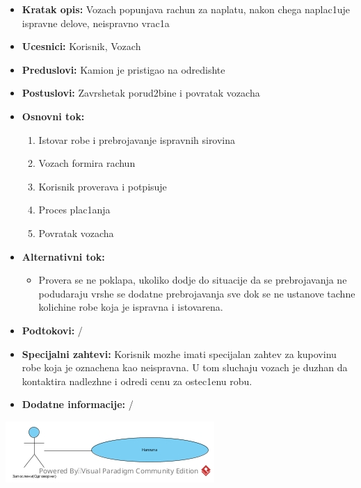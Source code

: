\begin{itemize}
	\item {\textbf{Kratak opis:}  Vozach popunjava rachun za naplatu, nakon chega naplac1uje ispravne delove, neispravno vrac1a}
	\item{\textbf{Ucesnici:} Korisnik, Vozach }
	\item{\textbf{Preduslovi:} Kamion je pristigao na odredishte }
	\item{\textbf{Postuslovi:} Zavrshetak porud2bine i povratak vozacha}
	\item{\textbf{Osnovni tok:}  \begin{enumerate}
				\item {Istovar robe i prebrojavanje ispravnih sirovina}
				\item {Vozach formira rachun}
				\item {Korisnik proverava i potpisuje}
				\item {Proces plac1anja}
				\item {Povratak vozacha}
	\end{enumerate}}
\item{\textbf{Alternativni tok:} \begin{itemize}
		\item{Provera se ne poklapa, ukoliko dodje do situacije da se prebrojavanja ne podudaraju vrshe se dodatne prebrojavanja sve dok se ne ustanove tachne kolichine robe koja je ispravna i istovarena.}
	\end{itemize}}
\item{\textbf{Podtokovi:} /}
\item{\textbf{Specijalni zahtevi:} Korisnik mozhe imati specijalan zahtev za kupovinu robe koja je oznachena kao neispravna. U tom sluchaju vozach je duzhan da kontaktira nadlezhne i odredi cenu za ostec1enu robu.}
\item{\textbf{Dodatne informacije:} /}
\end{itemize}
\includegraphics{Slike/SUnaplata.jpg}